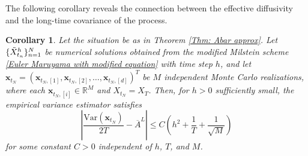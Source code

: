 \documentclass[12pt,a4paper,reqno]{amsart}
\newtheorem{corollary}{Corollary}[section]
\numberwithin{equation}{section}
\begin{document}
The following corollary reveals the connection between the effective diffusivity and the long-time covariance of the process.
\begin{corollary}
    Let the situation be as in Theorem \ref{Thm: Abar approx}. Let $\{\Tilde{X}^h_{t_n}\}_{n=1}^N$ be numerical solutions obtained from the modified Milstein scheme \eqref{Euler Maruyama with modified equation} with time step $h$, and let $\bm x_{t_N} =  (\bm x_{t_N,[1]},\bm x_{t_N,[2]},\dotsc, \bm x_{t_N,[d]})^T$ be 
    $M$ independent Monte Carlo realizations, where each $\bm x_{t_N,[i]} \in \mathbb{R}^M$ and $X_{t_N} = X_T$. Then, for $h>0$ sufficiently small, the empirical variance estimator satisfies
    \begin{equation}\label{eq:variance estimator}
        \left\lvert \frac{\mathrm{Var}(\bm x_{t_N})}{2T} - \overline{A}^L\right\rvert \leq C\left(h^2 +\frac{1}{T} +\frac{1}{\sqrt{M}}\right)
    \end{equation} 
for some constant $C>0$ independent of $h$, $T$, and $M$. 
\end{corollary}
\end{document}

